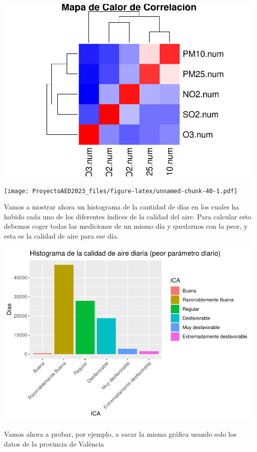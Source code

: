 \documentclass[notspecified,article,submit,moreauthors,pdftex]{Definitions/mdpi}
\begin{document}
\includegraphics{ProyectoAED2023_files/figure-latex/unnamed-chunk-39-1.pdf}

\texttt{[image: ProyectoAED2023\_files/figure-latex/unnamed-chunk-40-1.pdf]}

Vamos a mostrar ahora un histograma de la cantidad de días en los cuales
ha habido cada uno de los diferentes índices de la calidad del aire.
Para calcular esto debemos coger todas las mediciones de un mismo día y
quedarnos con la peor, y esta es la calidad de aire para ese día.

\includegraphics{ProyectoAED2023_files/figure-latex/unnamed-chunk-43-1.pdf}

Vamos ahora a probar, por ejemplo, a sacar la misma gráfica usando solo
los datos de la provincia de València
\end{document}
